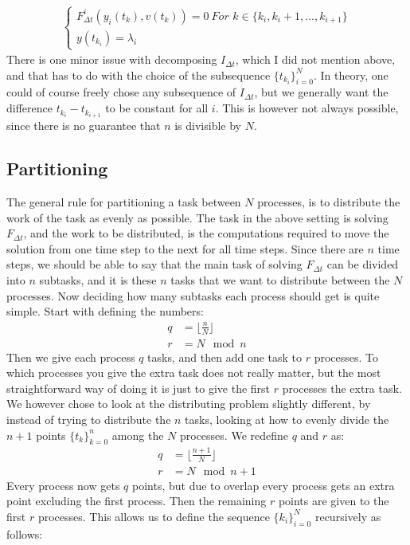 \begin{align*}
\left\{
     \begin{array}{lr}
		F_{\Delta t}^i(y_i(t_k),v(t_k))=0 \	\textit{For $k \in \{k_i,k_i+1,...,k_{i+1} \}$} \\
		y(t_{k_i})=\lambda_i
	\end{array}
   \right.	
\end{align*} 
There is one minor issue with decomposing $I_{\Delta t}$, which I did not mention above, and that has to do with the choice of the subsequence $\{t_{k_i}\}_{i=0}^N$. In theory, one could of course freely chose any subsequence of $I_{\Delta t}$, but we generally want the difference $t_{k_i} -t_{k_{i+1}}$ to be constant for all $i$. This is however not always possible, since there is no guarantee that $n$ is divisible by $N$.
\subsection{Partitioning}
The general rule for partitioning a task between $N$ processes, is to distribute the work of the task as evenly as possible. The task in the above setting is solving $ F_{\Delta t}$, and the work to be distributed, is the computations required to move the solution from one time step to the next for all time steps. Since there are $n$ time steps, we should be able to say that the main task of solving $F_{\Delta t}$ can be divided into $n$ subtasks, and it is these $n$ tasks that we want to distribute between the $N$ processes. Now deciding how many subtasks each process should get is quite simple. Start with defining the numbers:
\begin{align*}
q &= \lfloor \frac{n}{N}\rfloor \\
r &= N \mod n
\end{align*} 
Then we give each process $q$ tasks, and then add one task to $r$ processes. To which processes you give the extra task does not really matter, but the most straightforward way of doing it is just to give the first $r$ processes the extra task. We however chose to look at the distributing problem slightly different, by instead of trying to distribute the $n$ tasks, looking at how to evenly divide the $n+1$ points $\{t_k\}_{k=0}^{n}$ among the $N$ processes. We redefine $q$ and $r$ as:
\begin{align*}
q &= \lfloor \frac{n+1}{N}\rfloor \\
r &= N \mod n+1
\end{align*}
Every process now gets $q$ points, but due to overlap every process gets an extra point excluding the first process. Then the remaining $r$ points are given to the first $r$ processes. This allows us to define the sequence $\{k_{i}\}_{i=0}^N$ recursively as follows:
